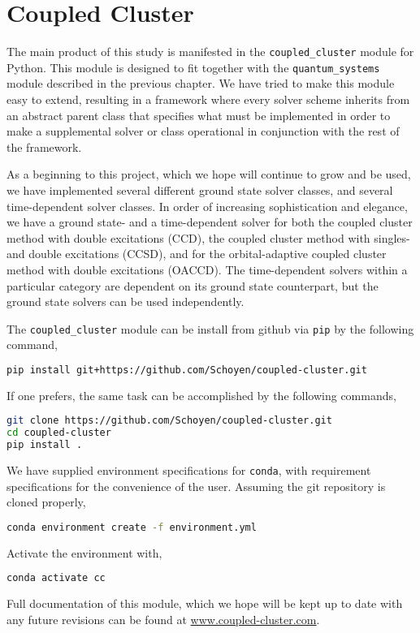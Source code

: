 \chapter{Coupled Cluster}

The main product of this study is manifested in the \lstinline{coupled_cluster}
module for Python. This module is designed to fit together with the
\lstinline{quantum_systems} module described in the previous chapter. We have tried to 
make this module easy to extend, resulting in a framework where every solver scheme 
inherits from an abstract parent class that specifies what must be implemented in order 
to make a supplemental solver or class operational in conjunction with the rest of the 
framework.

As a beginning to this project, which we hope will continue to grow and be used, 
we have implemented several different ground state solver classes, and several
time-dependent solver classes. In order of increasing sophistication and 
elegance, we have a ground state- and a time-dependent solver for both the coupled cluster
method
with double excitations (CCD), the coupled cluster method with singles- and double 
excitations (CCSD), and for the orbital-adaptive coupled cluster method with double
excitations (OACCD). The time-dependent solvers within a particular category are 
dependent on its ground state counterpart, but the ground state solvers can be used
independently.

The \lstinline{coupled_cluster} module can be install from github via \lstinline{pip}
by the following command,
\begin{lstlisting}[language=bash]
pip install git+https://github.com/Schoyen/coupled-cluster.git
\end{lstlisting}
If one prefers, the same task can be accomplished by the following commands,
\begin{lstlisting}[language=bash]
git clone https://github.com/Schoyen/coupled-cluster.git
cd coupled-cluster
pip install .
\end{lstlisting}
We have supplied environment specifications for \lstinline{conda}, with requirement 
specifications for the convenience of the user. Assuming the git repository is cloned 
properly,
\begin{lstlisting}[language=bash]
conda environment create -f environment.yml
\end{lstlisting}
Activate the environment with,
\begin{lstlisting}[language=bash]
conda activate cc
\end{lstlisting}
Full documentation of this module, which we hope will be kept up to date with any future revisions 
can be found at \url{www.coupled-cluster.com}.

